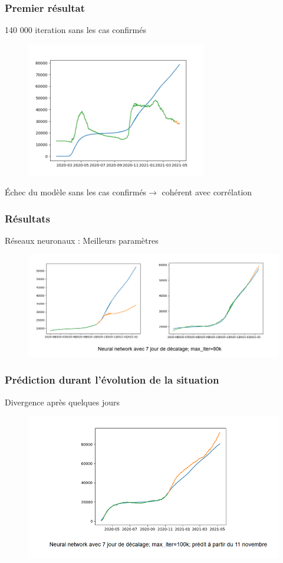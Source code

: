 \documentclass{beamer}
\begin{document}
\begin{frame}
	\frametitle{Premier résultat}
	140 000 iteration sans les cas confirmés
	\begin{figure}[h]
		\centering
		\includegraphics[width=0.7\textwidth]{NN mlpregressor 140k iter (updated data)}
	\end{figure}
	Échec du modèle sans les cas confirmés$\rightarrow$ cohérent avec corrélation
\end{frame}

\begin{frame}
	\frametitle{Résultats}
	Réseaux neuronaux : Meilleurs paramètres
	\begin{figure}
		\includegraphics[scale=0.6]{NN_3}
	\end{figure}
\end{frame}

\begin{frame}
	\frametitle{Prédiction durant l'évolution de la situation}
	Divergence après quelques jours
	\begin{figure}[h]
		\centering
		\includegraphics[width=\textwidth]{NN_1}
	\end{figure}
\end{frame}
\end{document}
